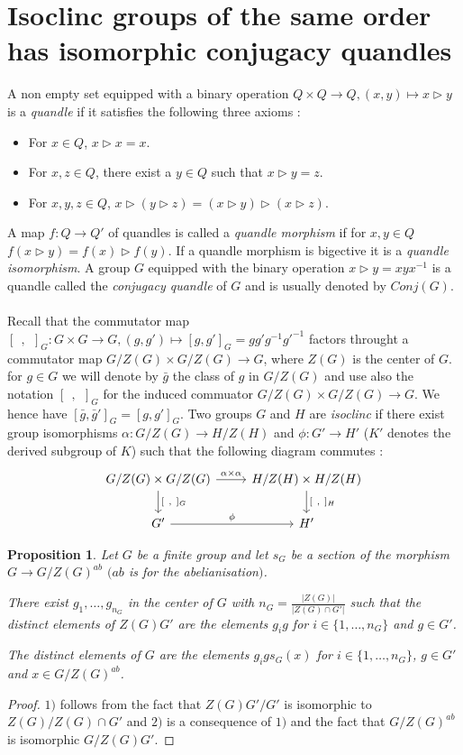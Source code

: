 \documentclass[12pt, reqno]{amsart}
\newtheorem{proposition}[theorem]{Proposition}
\begin{document}
\section{Isoclinc groups of the same order has isomorphic conjugacy quandles}
A non empty set equipped with a binary operation $Q\times Q \to Q, (x,y)\mapsto x\triangleright y$ is a \textit{quandle} if it satisfies the following three axioms :
\begin{itemize}
\item[1)] For $x\in Q$, $x\triangleright x = x$.
\item[2)] For $x,z \in Q$, there exist a $y\in Q$ such that $x\triangleright y=z$.
\item[3)] For $x,y,z\in Q$, $x\triangleright (y\triangleright z)=(x\triangleright y)\triangleright (x\triangleright z)$.
\end{itemize}
A map $f:Q\to Q'$ of quandles is called a \textit{quandle morphism} if for $x,y\in Q$ $f(x\triangleright y)=f(x)\triangleright f(y)$. If a quandle morphism is bigective it is a \textit{quandle isomorphism}. A group $G$ equipped with the binary operation $x\triangleright y=xyx^{-1}$ is a quandle called the \textit{conjugacy quandle} of $G$ and is usually denoted by $Conj(G)$. \\\\
Recall that the commutator map $[\:\:,\:\:]_G :G\times G \to G, (g,g')\mapsto [g,g']_G=gg'g^{-1}g'^{-1}$ factors throught a commutator map $G/Z(G) \times G/Z(G)\to G$, where $Z(G)$ is the center of $G$. for $g \in G$ we will denote by $\bar{g}$ the class of $g$ in $G/Z(G)$ and use also the notation $[\:\:, \:\:]_G$ for the induced commuator $G/Z(G) \times G/Z(G)\to G$. We hence have $[\bar{g},\bar{g}']_G=[g,g']_G$. Two groups $G$ and $H$ are \textit{isoclinc} if there exist group isomorphisms $\alpha :G/Z(G)\to H/Z(H)$ and $\phi : G' \to H'$ ($K'$ denotes the derived subgroup of $K$) such that the following diagram commutes :
$$\begin{tikzcd}
G/Z(G)\times G/Z(G)\arrow{r}{\alpha \times \alpha}\arrow{d}{[\:\:,\:\:]_G} &H/Z(H)\times H/Z(H) \arrow{d}{[\:\:,\:\:]_H} \\ 
G' \arrow{r}{\phi}  & H' 
\end{tikzcd} $$  



\begin{proposition}
Let $G$ be a finite group and let $s_G$ be a section of the morphism $G\to G/Z(G)^{ab}$ $($$ab$ is for the abelianisation$)$.
\item[1)] There exist $g_1,\dots,g_{n_G}$ in the center of $G$ with $n_G=\frac{\vert Z(G) \vert}{\vert Z(G) \cap G' \vert}$ such that the distinct elements of $Z(G)G'$ are the elements $g_ig$ for $i\in\{1,\dots,n_G\}$ and $g\in G'$.
\item[2)] The distinct elements of $G$ are the elements $g_igs_G(x)$ for $i\in \{1,\dots,n_G\}$, $g\in G'$ and $x\in G/Z(G)^{ab}$.
\end{proposition}
\begin{proof}
$1)$ follows from the fact that $Z(G)G'/G'$ is isomorphic to $Z(G)/Z(G)\cap G'$ and $2)$ is a consequence of $1)$ and the fact that $G/Z(G)^{ab}$ is isomorphic $G/Z(G)G'$.
\end{proof}
\end{document}
